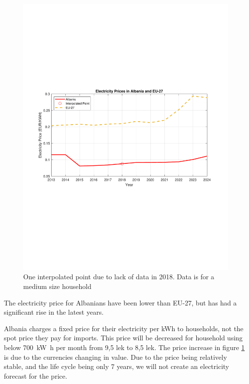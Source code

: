 \begin{figure}[H]
    \centering
    \includegraphics[width=\linewidth]{photos/EU27Electricity_Prices.pdf}
    \caption{One interpolated point due to lack of data in 2018. Data is for a medium size household\citep{eurostatElectricityPricesType2022}}
    \label{method:fig:EU27_elecprice}
\end{figure}

The electricity price for Albanians have been lower than EU-27, but has had a significant rise in the latest years.


Albania charges a fixed price for their electricity per kWh to households, not the spot price they pay for imports. This price will be decreased for household using below \SI{700}{\kilo\watt\hour} per month from 9,5 \acrshort{lek} to 8,5 \acrshort{lek}\citep{euronewsalbaniaImplementationNewElectricity2025}. The price increase in figure \ref{method:fig:EU27_elecprice} is due to the currencies changing in value. Due to the price being relatively stable, and the life cycle being only 7 years, we will not create an electricity forecast for the price. 

